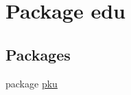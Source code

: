 \hypertarget{namespaceedu}{
\section{Package edu}
\label{namespaceedu}
}
\subsection*{Packages}
\begin{DoxyCompactItemize}
\item 
package \hyperlink{namespaceedu_1_1pku}{pku}
\end{DoxyCompactItemize}
